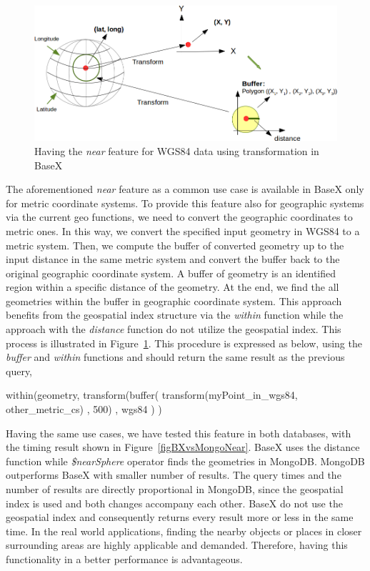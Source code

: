 \documentclass[a4paper,12pt]{article}
\begin{document}
\begin{figure}
\centering
\includegraphics[width=\textwidth]{Transform}
\caption{Having the \textit{near} feature for WGS84 data using transformation in BaseX}
\label{figTransform}
\end{figure}

The aforementioned \textit{near} feature as a common use case is available in BaseX only for metric coordinate systems. To provide this feature also for geographic systems via the current geo functions, we need to convert the geographic coordinates to metric ones. In this way, we convert the specified input geometry in WGS84 to a metric system. Then, we compute the buffer of converted geometry up to the input distance in the same metric system and convert the buffer back to the original geographic coordinate system. A buffer of geometry is an identified region within a specific distance of the geometry. At the end, we find the all geometries within the buffer in geographic coordinate system. This approach benefits from the geospatial index structure via the \textit{within} function while the approach with the \textit{distance} function do not utilize the geospatial index. This process is illustrated in Figure~\ref{figTransform}. 
This procedure is expressed as below, using the \textit{buffer} and \textit{within} functions and should return the same result as the previous query, 

\vspace{10px}
\begin{fakeJSON} 
within(geometry,
       transform(buffer(
                   transform(myPoint_in_wgs84, other_metric_cs)
                   , 500)
                 , wgs84
                )
      )
\end{fakeJSON}
\vspace{10px}
Having the same use cases, we have tested this feature in both databases, with the timing result shown in Figure~\ref{figBXvsMongoNear}. BaseX uses the distance function while \textit{\$nearSphere} operator finds the geometries in MongoDB. MongoDB outperforms BaseX with smaller number of results. The query times and the number of results are directly proportional in MongoDB, since the geospatial index is used and both changes accompany each other. BaseX do not use the geospatial index and consequently returns every result more or less in the same time. In the real world applications, finding the nearby objects or places in closer surrounding areas are highly applicable and demanded. Therefore, having this functionality in a better performance is advantageous.
\end{document}
